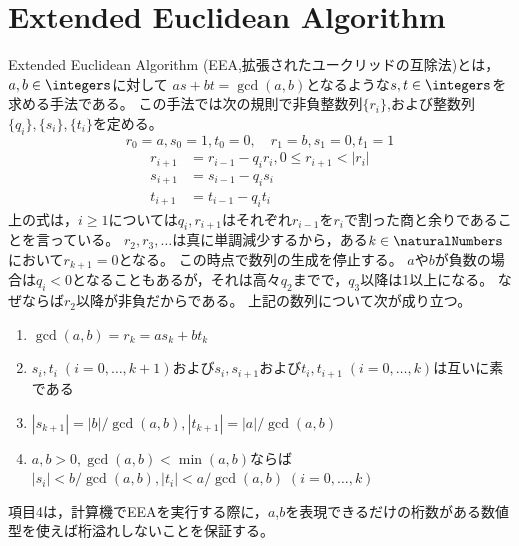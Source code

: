     \section{Extended Euclidean Algorithm}
        Extended Euclidean Algorithm (EEA,拡張されたユークリッドの互除法)とは，$a,b\in\integers$に対して
        $as + bt = \gcd(a,b)$となるような$s,t\in\integers$を求める手法である。
        この手法では次の規則で非負整数列$\{r_i\}$,および整数列$\{q_i\}, \{s_i\}, \{t_i\}$を定める。
        \[ r_0 = a, s_0 = 1, t_0 = 0,\quad r_1 = b, s_1 = 0, t_1 = 1 \]
        \begin{align*}
            r_{i+1} &= r_{i-1} - q_ir_i,0 \leq r_{i+1} < |r_i| \\
            s_{i+1} &= s_{i-1} - q_is_i \\
            t_{i+1} &= t_{i-1} - q_it_i
        \end{align*}
        上の式は，$i\geq 1$については$q_i,r_{i+1}$はそれぞれ$r_{i-1}$を$r_i$で割った商と余りであることを言っている。
        $r_2,r_3,\dotsc$は真に単調減少するから，ある$k\in\naturalNumbers$において$r_{k+1}=0$となる。
        この時点で数列の生成を停止する。
        $a$や$b$が負数の場合は$q_i<0$となることもあるが，それは高々$q_2$までで，$q_3$以降は1以上になる。
        なぜならば$r_2$以降が非負だからである。
        上記の数列について次が成り立つ。
        \begin{enumerate}
            \item $\gcd(a,b) = r_k = as_k + bt_k$
            \item $s_i,t_i\;(i=0,\dotsc,k+1)$および$s_i,s_{i+1}$および$t_i,t_{i+1}\;(i=0,\dotsc,k)$は互いに素である
            \item $|s_{k+1}| = |b|/\gcd(a,b),|t_{k+1}| = |a|/\gcd(a,b)$
            \item $a,b>0,\gcd(a,b) < \min(a,b)$ならば$|s_i| < b/\gcd(a,b),|t_i| < a/\gcd(a,b)\;(i=0,\dotsc,k)$
        \end{enumerate}
        項目4は，計算機でEEAを実行する際に，$a$,$b$を表現できるだけの桁数がある数値型を使えば桁溢れしないことを保証する。

